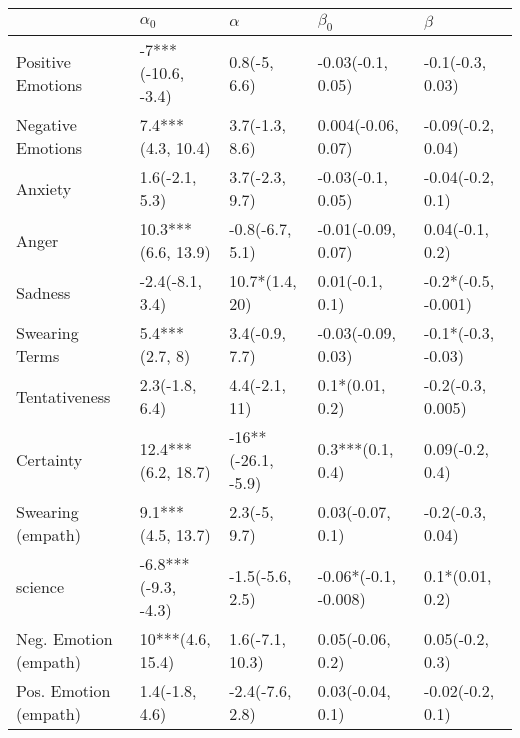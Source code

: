 \begin{tabular}{lllll}
\toprule
{} &           $\alpha_0$ &            $\alpha$ &             $\beta_0$ &              $\beta$ \\
\midrule
Positive Emotions     &   -7***(-10.6, -3.4) &        0.8(-5, 6.6) &     -0.03(-0.1, 0.05) &     -0.1(-0.3, 0.03) \\
Negative Emotions     &    7.4***(4.3, 10.4) &      3.7(-1.3, 8.6) &    0.004(-0.06, 0.07) &    -0.09(-0.2, 0.04) \\
Anxiety               &       1.6(-2.1, 5.3) &      3.7(-2.3, 9.7) &     -0.03(-0.1, 0.05) &     -0.04(-0.2, 0.1) \\
Anger                 &   10.3***(6.6, 13.9) &     -0.8(-6.7, 5.1) &    -0.01(-0.09, 0.07) &      0.04(-0.1, 0.2) \\
Sadness               &      -2.4(-8.1, 3.4) &      10.7*(1.4, 20) &       0.01(-0.1, 0.1) &  -0.2*(-0.5, -0.001) \\
Swearing Terms        &       5.4***(2.7, 8) &      3.4(-0.9, 7.7) &    -0.03(-0.09, 0.03) &   -0.1*(-0.3, -0.03) \\
Tentativeness         &       2.3(-1.8, 6.4) &       4.4(-2.1, 11) &       0.1*(0.01, 0.2) &    -0.2(-0.3, 0.005) \\
Certainty             &   12.4***(6.2, 18.7) &  -16**(-26.1, -5.9) &      0.3***(0.1, 0.4) &      0.09(-0.2, 0.4) \\
Swearing (empath)     &    9.1***(4.5, 13.7) &        2.3(-5, 9.7) &      0.03(-0.07, 0.1) &     -0.2(-0.3, 0.04) \\
science               &  -6.8***(-9.3, -4.3) &     -1.5(-5.6, 2.5) &  -0.06*(-0.1, -0.008) &      0.1*(0.01, 0.2) \\
Neg. Emotion (empath) &     10***(4.6, 15.4) &     1.6(-7.1, 10.3) &      0.05(-0.06, 0.2) &      0.05(-0.2, 0.3) \\
Pos. Emotion (empath) &       1.4(-1.8, 4.6) &     -2.4(-7.6, 2.8) &      0.03(-0.04, 0.1) &     -0.02(-0.2, 0.1) \\
\bottomrule
\end{tabular}
